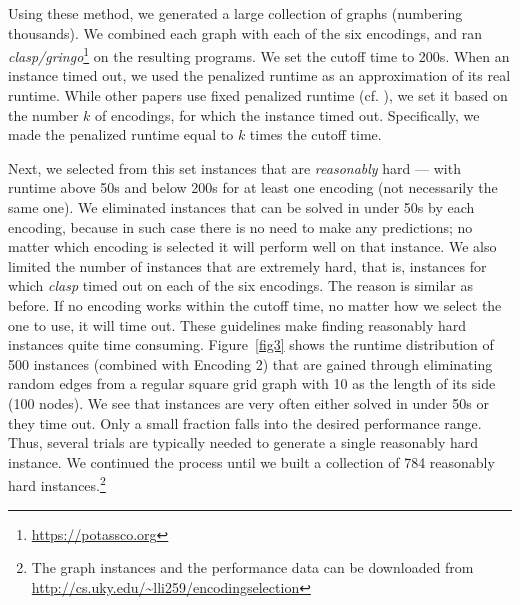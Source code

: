 \documentclass{new_tlp}
\begin{document}
Using these method, we generated a large collection of graphs (numbering
thousands). We combined each graph with each of the six encodings, and ran 
\emph{clasp/gringo}\footnote{\url{https://potassco.org}} on the resulting 
programs. We set the cutoff time to 200s. 
When an instance timed out, we used the penalized runtime as an approximation 
of its real runtime. While other papers use fixed penalized runtime (cf.
\cite{HoosLS14}), we set it based on the number $k$ of encodings,
for which the instance timed out. Specifically, we made the penalized runtime 
equal to $k$ times the cutoff time.

Next, we selected from this set instances that are \emph{reasonably} hard --- 
with runtime above 50s and below 200s for at least one encoding (not 
necessarily the same one). We eliminated instances that can be solved in 
under 50s by each encoding, because in such case there is no need to make 
any predictions; no matter which encoding is selected it will perform well 
on that instance. We also limited the number of instances that are extremely 
hard, that is, instances for which \emph{clasp} timed out on each of the 
six encodings. The reason is similar as before. If no encoding works within 
the cutoff time, no matter how we select the one to use, it will time out. 
These guidelines make finding reasonably hard instances quite time consuming. 
Figure~\ref{fig3} shows the runtime distribution of 500 instances (combined 
with Encoding 2) that are gained through eliminating random edges from a 
regular square grid graph with 10 as the length of its side (100 nodes). 
We see that instances are very often either solved in under 50s or they time 
out. Only a small fraction falls into the desired performance range. Thus,
several trials are typically needed to generate a single reasonably hard 
instance. We continued the process until we built a collection of 784 
reasonably hard instances.\footnote{The graph instances and the performance data can be downloaded from \url{http://cs.uky.edu/~lli259/encodingselection}}
\end{document}
